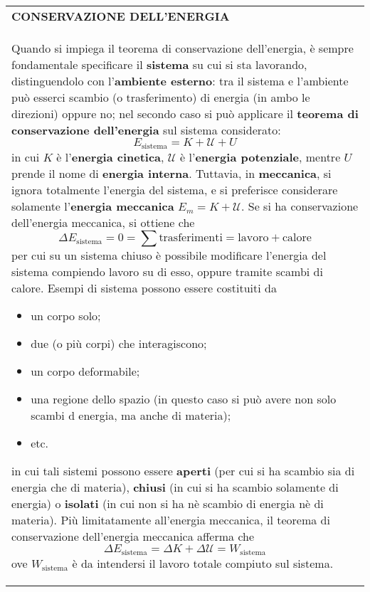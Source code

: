 \documentclass[a4paper]{extarticle}
\renewcommand\arraystretch{}
\begin{document}
\vspace{1em}
\setlength{\tabcolsep}{14pt}
\renewcommand{\arraystretch}{2}
\noindent
\begin{tabularx}{\textwidth}{@{}|P|@{}}
    \hline
    {\textbf{CONSERVAZIONE DELL'ENERGIA}}\\
    \parbox{\linewidth}{Quando si impiega il teorema di conservazione dell'energia, è sempre fondamentale specificare il \textbf{sistema} su cui si sta lavorando, distinguendolo con l'\textbf{ambiente esterno}: tra il sistema e l'ambiente può esserci scambio (o trasferimento) di energia (in ambo le direzioni) oppure no; nel secondo caso si può applicare il \textbf{teorema di conservazione dell'energia} sul sistema considerato:
    \[\boxed{E_{\text{sistema}}=K+\mathcal{U}+U}\]
    in cui $K$ è l'\textbf{energia cinetica}, $\mathcal{U}$ è l'\textbf{energia potenziale}, mentre $U$ prende il nome di \textbf{energia interna}. Tuttavia, in \textbf{meccanica}, si ignora totalmente l'energia del sistema, e si preferisce considerare solamente l'\textbf{energia meccanica} $E_m=K+\mathcal{U}$.\\
    Se si ha conservazione dell'energia meccanica, si ottiene che
    \[\boxed{\Delta E_{\text{sistema}}=0=\sum\text{trasferimenti}=\text{lavoro}+\text{calore}}\]
    per cui su un sistema chiuso è possibile modificare l'energia del sistema compiendo lavoro su di esso, oppure tramite scambi di calore. Esempi di sistema possono essere costituiti da
    \begin{itemize}
      \item un corpo solo;
      \item due (o più corpi) che interagiscono;
      \item un corpo deformabile;
      \item una regione dello spazio (in questo caso si può avere non solo scambi d energia, ma anche di materia);
      \item etc.
    \end{itemize}
    in cui tali sistemi possono essere \textbf{aperti} (per cui si ha scambio sia di energia che di materia), \textbf{chiusi} (in cui si ha scambio solamente di energia) o \textbf{isolati} (in cui non si ha nè scambio di energia nè di materia).\\
    Più limitatamente all'energia meccanica, il teorema di conservazione dell'energia meccanica afferma che
    \[\boxed{\Delta E_{\text{sistema}}=\Delta K + \Delta \mathcal{U}=W_{\text{sistema}}}\]
    ove $W_{\text{sistema}}$ è da intendersi il lavoro totale compiuto sul sistema.\vspace{3mm}}\\
    \hline
\end{tabularx}
\end{document}
